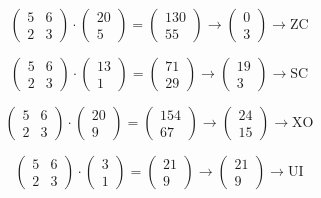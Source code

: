 \documentclass[a4paper,12pt,twocolumn]{article}
\begin{document}
\begin{equation}
\begin{pmatrix} 5 & 6 \\ 2 & 3 \end{pmatrix} \cdot \begin{pmatrix} 20 \\ 5 \end{pmatrix} = \begin{pmatrix} 130 \\ 55 \end{pmatrix} \rightarrow \begin{pmatrix} 0 \\ 3 \end{pmatrix} \rightarrow \text{ZC}
\end{equation}

\begin{equation}
\begin{pmatrix} 5 & 6 \\ 2 & 3 \end{pmatrix} \cdot \begin{pmatrix} 13 \\ 1 \end{pmatrix} = \begin{pmatrix} 71 \\ 29 \end{pmatrix} \rightarrow \begin{pmatrix} 19 \\ 3 \end{pmatrix} \rightarrow \text{SC}
\end{equation}

\begin{equation}
\begin{pmatrix} 5 & 6 \\ 2 & 3 \end{pmatrix} \cdot \begin{pmatrix} 20 \\ 9 \end{pmatrix} = \begin{pmatrix} 154 \\ 67 \end{pmatrix} \rightarrow \begin{pmatrix} 24 \\ 15 \end{pmatrix} \rightarrow \text{XO}
\end{equation}

\begin{equation}
\begin{pmatrix} 5 & 6 \\ 2 & 3 \end{pmatrix} \cdot \begin{pmatrix} 3 \\ 1 \end{pmatrix} = \begin{pmatrix} 21 \\ 9 \end{pmatrix} \rightarrow \begin{pmatrix} 21 \\ 9 \end{pmatrix} \rightarrow \text{UI}
\end{equation}
\end{document}
